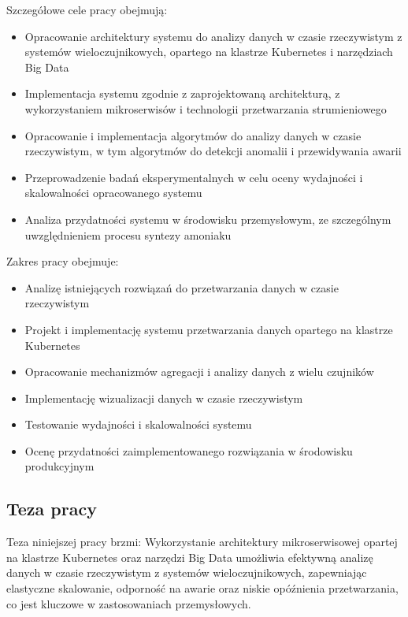 Szczegółowe cele pracy obejmują:
\begin{itemize}
    \item Opracowanie architektury systemu do analizy danych w czasie rzeczywistym z systemów wieloczujnikowych, opartego na klastrze Kubernetes i narzędziach Big Data
    \item Implementacja systemu zgodnie z zaprojektowaną architekturą, z wykorzystaniem mikroserwisów i technologii przetwarzania strumieniowego
    \item Opracowanie i implementacja algorytmów do analizy danych w czasie rzeczywistym, w tym algorytmów do detekcji anomalii i przewidywania awarii
    \item Przeprowadzenie badań eksperymentalnych w celu oceny wydajności i skalowalności opracowanego systemu
    \item Analiza przydatności systemu w środowisku przemysłowym, ze szczególnym uwzględnieniem procesu syntezy amoniaku
\end{itemize}

Zakres pracy obejmuje:
\begin{itemize}
    \item Analizę istniejących rozwiązań do przetwarzania danych w czasie rzeczywistym
    \item Projekt i implementację systemu przetwarzania danych opartego na klastrze Kubernetes
    \item Opracowanie mechanizmów agregacji i analizy danych z wielu czujników
    \item Implementację wizualizacji danych w czasie rzeczywistym
    \item Testowanie wydajności i skalowalności systemu
    \item Ocenę przydatności zaimplementowanego rozwiązania w środowisku produkcyjnym
\end{itemize}

\subsection{Teza pracy}
\label{subsec:teza}

Teza niniejszej pracy brzmi: Wykorzystanie architektury mikroserwisowej opartej na klastrze Kubernetes oraz narzędzi Big Data umożliwia efektywną analizę danych w czasie rzeczywistym z systemów wieloczujnikowych, zapewniając elastyczne skalowanie, odporność na awarie oraz niskie opóźnienia przetwarzania, co jest kluczowe w zastosowaniach przemysłowych.

